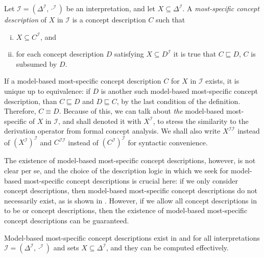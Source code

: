 \begin{Definition}
  \label{def:most-specific-concept-description}
  Let $\mathcal{I} = (\Delta^{\mathcal{I}}, \cdot^{\mathcal{I}})$ be an interpretation, and
  let $X \subseteq \Delta^{\mathcal{I}}$.  A \emph{most-specific concept description} of
  $X$ in $\mathcal{I}$ is a concept description $C$ such that
  \begin{enumerate}[i. ]
  \item $X \subseteq C^{\mathcal{I}}$, and
  \item for each concept description $D$ satisfying $X \subseteq D^{\mathcal{I}}$ it is
    true that $C \sqsubseteq D$, \ie $C$ is subsumed by $D$.
  \end{enumerate}
\end{Definition}

If a model-based most-specific concept description $C$ for $X$ in $\mathcal{I}$ exists, it
is unique up to equivalence: if $D$ is another such model-based most-specific concept
description, than $C \sqsubseteq D$ and $D \sqsubseteq C$, by the last condition of the
definition.  Therefore, $C \equiv D$.  Because of this, we can talk about \emph{the}
model-based most-specific of $X$ in $\mathcal{I}$, and shall denoted it with
$X^{\mathcal{I}}$, to stress the similarity to the derivation operator from formal concept
analysis.  We shall also write $X^{\mathcal{I}\mathcal{I}}$ instead of
$(X^{\mathcal{I}})^{\mathcal{I}}$ and $C^{\mathcal{I}\mathcal{I}}$ instead of
$(C^{\mathcal{I}})^{\mathcal{I}}$ for syntactic convenience.

The existence of model-based most-specific concept descriptions, however, is not clear per
se, and the choice of the description logic in which we seek for model-based most-specific
concept descriptions is crucial here: if we only consider \ELbot concept descriptions,
then model-based most-specific concept descriptions do not necessarily exist, as is shown
in .  However, if we allow all concept
descriptions in  to be \ELgfp or \ELgfpbot
concept descriptions, then the existence of model-based most-specific concept descriptions
can be guaranteed.

\begin{Theorem}
  \label{thm:existence-of-mmscs-in-ELgfpbot}
  Model-based most-specific concept descriptions exist in \ELgfp and \ELgfpbot for all
  interpretations $\mathcal{I} = (\Delta^{\mathcal{I}}, \cdot^{\mathcal{I}})$ and sets $X
  \subseteq \Delta^{\mathcal{I}}$, and they can be computed effectively.
\end{Theorem}

